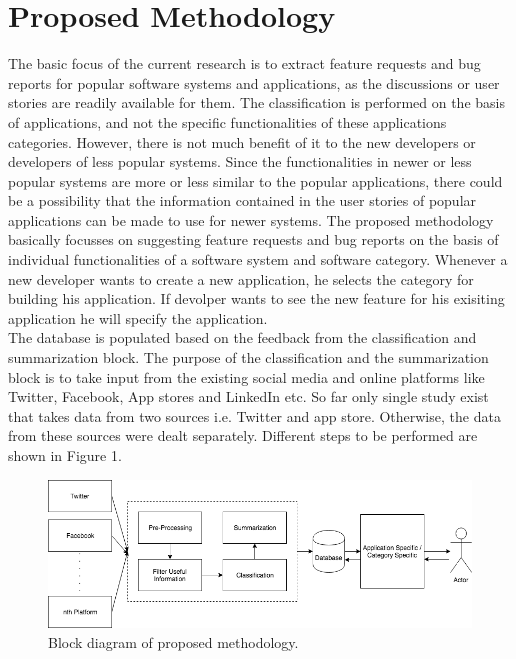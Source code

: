 \section{Proposed Methodology}
The basic focus of the current research is to extract feature requests and bug reports for popular
software systems and applications, as the discussions or user stories are readily available for
them. The classification is performed on the basis of applications, and not the specific
functionalities of these applications categories. However, there is not much benefit of it to the new
developers or developers of less popular systems. Since the functionalities in newer or less popular systems are more or less similar to the popular
applications, there could be a possibility that the information contained in the user stories of
popular applications can be made to use for newer systems. The proposed methodology
basically focusses on suggesting feature requests and bug reports on the basis of individual
functionalities of a software system and software category. Whenever a new developer wants to create a new
application, he selects the category for building his application. If devolper wants to see the new feature for his exisiting application he will specify the application.\\

	The database is populated based on the feedback from the classification and summarization
block. The purpose of the classification and the summarization block is to take input from the
existing social media and online platforms like Twitter, Facebook, App stores and LinkedIn etc.
So far only single study \cite{Nayebi} exist that takes data from two sources i.e. Twitter and app store.
Otherwise, the data from these sources were dealt separately. Different steps to be
performed are shown in Figure 1.

\begin{figure}
\includegraphics[width=\linewidth]{fig.png}
\caption{Block diagram of proposed methodology.}
\end{figure}

